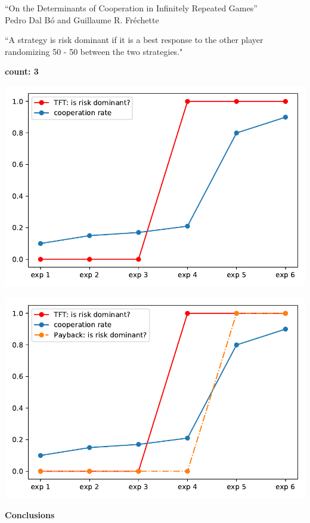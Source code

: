 \documentclass{beamer}
\begin{document}
\begin{frame}
    \begin{center}
    \LARGE{``On the Determinants of Cooperation in Infinitely Repeated Games''} \\ \vspace{.5cm}
    \normalsize{Pedro Dal Bó and Guillaume R. Fréchette}
    \end{center}
\end{frame}

\begin{frame}
    \begin{center}
    ``A strategy is risk dominant if it is a best response to the other player
    randomizing 50 - 50 between the two strategies."
    \vspace{2cm}

    \pause
    \hspace{6cm} \textbf{count: 3}
    \end{center}
\end{frame}

\begin{frame}
    \centering
    \includegraphics[width=.75\textwidth]{static/tft_rd.pdf}
\end{frame}

\begin{frame}
    \centering
    \includegraphics[width=.75\textwidth]{static/payback_rd.pdf}
\end{frame}

\begin{frame}
    \begin{center}
    \LARGE{\textbf{Conclusions}}
    \end{center}
\end{frame}
\end{document}
